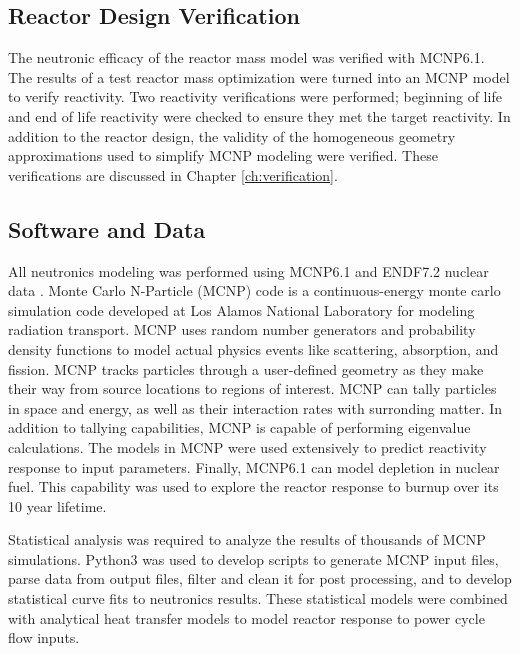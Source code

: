 \subsection{Reactor Design Verification}
The neutronic efficacy of the reactor mass model was verified with MCNP6.1. The
results of a test reactor mass optimization were turned into an MCNP model to
verify reactivity. Two reactivity verifications were performed; beginning of life
and end of life reactivity were checked to ensure they met the target
reactivity. In addition to the reactor design, the validity of the homogeneous
geometry approximations used to simplify MCNP modeling were verified. These
verifications are discussed in Chapter \ref{ch:verification}.

\subsection{Software and Data}
All neutronics modeling was performed using MCNP6.1 and ENDF7.2 nuclear data 
\cite{mcnp_citation}. Monte Carlo N-Particle (MCNP) code is a continuous-energy 
monte carlo simulation code developed at Los Alamos National Laboratory
for modeling radiation transport. MCNP uses random number generators and
probability density functions to model actual physics events like scattering,
absorption, and fission. MCNP tracks particles through a user-defined geometry
as they make their way from source locations to regions of interest. MCNP can
tally particles in space and energy, as well as their interaction rates with
surronding matter. In addition to tallying capabilities, MCNP is capable of
performing eigenvalue calculations. The \keff models in MCNP were used
extensively to predict reactivity response to input parameters. Finally, MCNP6.1
can model depletion in nuclear fuel. This capability was used to explore the
reactor response to burnup over its 10 year lifetime.

Statistical analysis was required to analyze the results of thousands of MCNP
simulations. Python3 was used to develop scripts to generate MCNP input files, parse data from output
files, filter and clean it for post processing, and to develop statistical curve
fits to neutronics results. These statistical models were combined with
analytical heat transfer models to model reactor response to power cycle flow
inputs.

